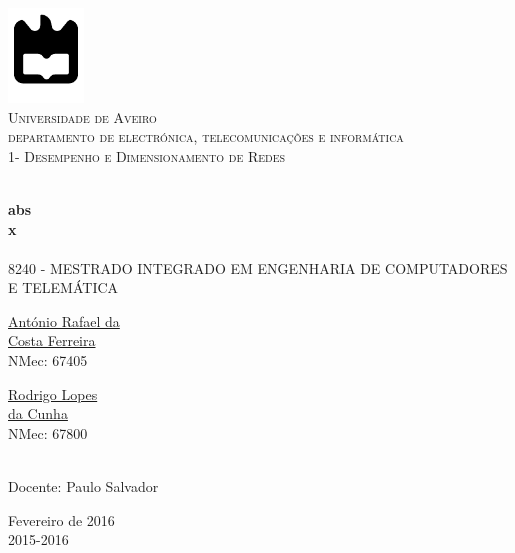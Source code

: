 \begin{titlepage}

\begin{center}

\includegraphics[width=0.15\textwidth]{./logo}\\[0.5cm]    

\textsc{\large Universidade de Aveiro \\[1cm]\large departamento de electrónica, telecomunicações e informática}\\[1cm]

\textsc{\large{1}\large - Desempenho e Dimensionamento de Redes\\[1cm]}

\HRule \\[0.5cm]
{ \huge \bfseries abs}\\[0.4cm]
{ \large \bfseries x}\\[0.4cm]
\HRule \\[1cm]

\textsc{\small{8240 - MESTRADO INTEGRADO EM ENGENHARIA DE COMPUTADORES E TELEMÁTICA}}\\[1cm]

\begin{minipage}{0.4\textwidth}

\begin{flushleft} \large
\href{mailto:rafael.ferreira@ua.pt}{António Rafael da \\ Costa Ferreira }
 \small{\\NMec: 67405}
\end{flushleft}
\end{minipage}
\begin{minipage}{0.4\textwidth}

\begin{flushright} \large
\href{mailto:rodrigocunha@ua.pt}{Rodrigo Lopes \\ da Cunha}
\small{\\NMec: 67800}
\end{flushright}
\end{minipage}\\[1cm]

{\large Docente: Paulo Salvador }\\[0.5cm]

\vfill

{\large Fevereiro de 2016 \\ 2015-2016}

\end{center}

\end{titlepage}